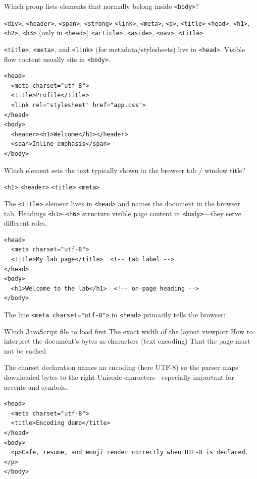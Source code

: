 \question[4]
Which group lists elements that normally belong inside \texttt{<body>}?
\begin{choices}
  \CorrectChoice \texttt{<div>}, \texttt{<header>}, \texttt{<span>}, \texttt{<strong>}
  \choice \texttt{<link>}, \texttt{<meta>}, \texttt{<p>}, \texttt{<title>}
  \choice \texttt{<head>}, \texttt{<h1>}, \texttt{<h2>}, \texttt{<h3>} (only in \texttt{<head>})
  \choice \texttt{<article>}, \texttt{<aside>}, \texttt{<nav>}, \texttt{<title>}
\end{choices}
\begin{solution}
  \texttt{<title>}, \texttt{<meta>}, and \texttt{<link>} (for metadata/stylesheets) live in \texttt{<head>}. Visible flow content usually sits in \texttt{<body>}.
\begin{lstlisting}[style=htmlinline]
<head>
  <meta charset="utf-8">
  <title>Profile</title>
  <link rel="stylesheet" href="app.css">
</head>
<body>
  <header><h1>Welcome</h1></header>
  <span>Inline emphasis</span>
</body>
\end{lstlisting}
\end{solution}



\newpage



\question[4]
Which element sets the text typically shown in the browser tab / window title?
\begin{choices}
  \choice \texttt{<h1>}
  \choice \texttt{<header>}
  \CorrectChoice \texttt{<title>}
  \choice \texttt{<meta>}
\end{choices}
\begin{solution}
  The \texttt{<title>} element lives in \texttt{<head>} and names the document in the browser tab. Headings \texttt{<h1>}--\texttt{<h6>} structure visible page content in \texttt{<body>}---they serve different roles.
\begin{lstlisting}[style=htmlinline]
<head>
  <meta charset="utf-8">
  <title>My lab page</title>  <!-- tab label -->
</head>
<body>
  <h1>Welcome to the lab</h1>  <!-- on-page heading -->
</body>
\end{lstlisting}
\end{solution}

\question[4]
The line \texttt{<meta charset="utf-8">} in \texttt{<head>} primarily tells the browser:
\begin{choices}
  \choice Which JavaScript file to load first
  \choice The exact width of the layout viewport
  \CorrectChoice How to interpret the document's bytes as characters (text encoding)
  \choice That the page must not be cached
\end{choices}
\begin{solution}
  The charset declaration names an encoding (here UTF-8) so the parser maps downloaded bytes to the right Unicode characters---especially important for accents and symbols.
\begin{lstlisting}[style=htmlinline]
<head>
  <meta charset="utf-8">
  <title>Encoding demo</title>
</head>
<body>
  <p>Cafe, resume, and emoji render correctly when UTF-8 is declared.</p>
</body>
\end{lstlisting}
\end{solution}




